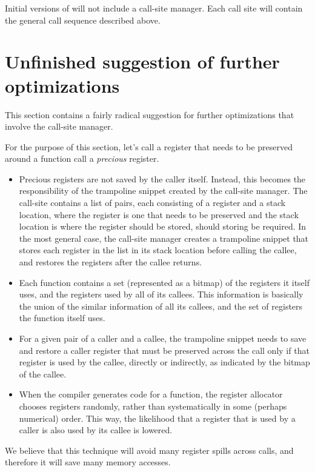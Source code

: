 Initial versions of \sysname{} will not include a call-site manager.
Each call site will contain the general call sequence described
above.

\section{Unfinished suggestion of further optimizations}

This section contains a fairly radical suggestion for further
optimizations that involve the call-site manager.

For the purpose of this section, let's call a register that needs to
be preserved around a function call a \emph{precious} register.

\begin{itemize}
\item Precious registers are not saved by the caller itself.  Instead,
  this becomes the responsibility of the trampoline snippet created by
  the call-site manager.  The call-site contains a list of pairs, each
  consisting of a register and a stack location, where the register is
  one that needs to be preserved and the stack location is where the
  register should be stored, should storing be required.  In the most
  general case, the call-site manager creates a trampoline snippet
  that stores each register in the list in its stack location before
  calling the callee, and restores the registers after the callee
  returns.
\item Each function contains a set (represented as a bitmap) of the
  registers it itself uses, and the registers used by all of its
  callees.  This information is basically the union of the similar
  information of all its callees, and the set of registers the
  function itself uses.
\item For a given pair of a caller and a callee, the trampoline
  snippet needs to save and restore a caller register that must be
  preserved across the call only if that register is used by the
  callee, directly or indirectly, as indicated by the bitmap of the
  callee.
\item When the compiler generates code for a function, the register
  allocator chooses registers randomly, rather than systematically in
  some (perhaps numerical) order.  This way, the likelihood that a
  register that is used by a caller is also used by its callee is
  lowered.
\end{itemize}

We believe that this technique will avoid many register spills across
calls, and therefore it will save many memory accesses.

